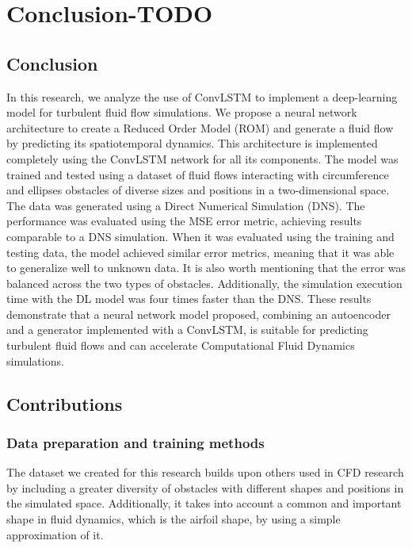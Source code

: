 
\chapter{Conclusion-TODO}
\label{ch:Conclusion}

\section{Conclusion}
\label{sec:Conclusion}

In this research, we analyze the use of ConvLSTM to implement a deep-learning model for turbulent fluid flow simulations. We propose a neural network architecture to create a Reduced Order Model (ROM) and generate a fluid flow by predicting its spatiotemporal dynamics. This architecture is implemented completely using the ConvLSTM network for all its components. The model was trained and tested using a dataset of fluid flows interacting with circumference and ellipses obstacles of diverse sizes and positions in a two-dimensional space. The data was generated using a Direct Numerical Simulation (DNS). The performance was evaluated using the MSE error metric, achieving results comparable to a DNS simulation. When it was evaluated using the training and testing data, the model achieved similar error metrics, meaning that it was able to generalize well to unknown data. It is also worth mentioning that the error was balanced across the two types of obstacles. Additionally, the simulation execution time with the DL model was four times faster than the DNS. These results demonstrate that a neural network model proposed, combining an autoencoder and a generator implemented with a ConvLSTM, is suitable for predicting turbulent fluid flows and can accelerate Computational Fluid Dynamics simulations.

\section{Contributions}
\label{sec:Contributions}

\subsection{Data preparation and training methods}
The dataset we created for this research builds upon others used in CFD research by including a greater diversity of obstacles with different shapes and positions in the simulated space. Additionally, it takes into account a common and important shape in fluid dynamics, which is the airfoil shape, by using a simple approximation of it.

